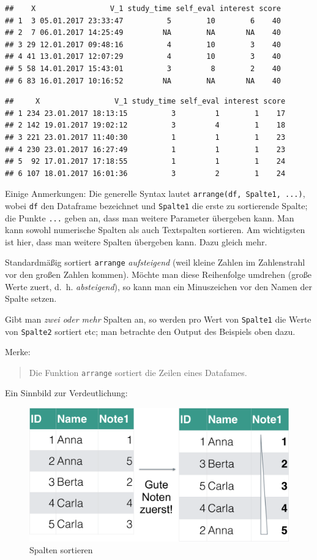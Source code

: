 \documentclass[12pt,ngerman,paper=a4,pagesize,DIV=13]{scrreprt}
\begin{document}
\begin{verbatim}
##    X                 V_1 study_time self_eval interest score
## 1  3 05.01.2017 23:33:47          5        10        6    40
## 2  7 06.01.2017 14:25:49         NA        NA       NA    40
## 3 29 12.01.2017 09:48:16          4        10        3    40
## 4 41 13.01.2017 12:07:29          4        10        3    40
## 5 58 14.01.2017 15:43:01          3         8        2    40
## 6 83 16.01.2017 10:16:52         NA        NA       NA    40
\end{verbatim}

\begin{verbatim}
##     X                 V_1 study_time self_eval interest score
## 1 234 23.01.2017 18:13:15          3         1        1    17
## 2 142 19.01.2017 19:02:12          3         4        1    18
## 3 221 23.01.2017 11:40:30          1         1        1    23
## 4 230 23.01.2017 16:27:49          1         1        1    23
## 5  92 17.01.2017 17:18:55          1         1        1    24
## 6 107 18.01.2017 16:01:36          3         2        1    24
\end{verbatim}

Einige Anmerkungen: Die generelle Syntax lautet
\texttt{arrange(df,\ Spalte1,\ ...)}, wobei \texttt{df} den Dataframe
bezeichnet und \texttt{Spalte1} die erste zu sortierende Spalte; die
Punkte \texttt{...} geben an, dass man weitere Parameter übergeben kann.
Man kann sowohl numerische Spalten als auch Textspalten sortieren. Am
wichtigsten ist hier, dass man weitere Spalten übergeben kann. Dazu
gleich mehr.

Standardmäßig sortiert \texttt{arrange} \emph{aufsteigend} (weil kleine
Zahlen im Zahlenstrahl vor den großen Zahlen kommen). Möchte man diese
Reihenfolge umdrehen (große Werte zuert, d.~h. \emph{absteigend}), so
kann man ein Minuszeichen vor den Namen der Spalte setzen.

Gibt man \emph{zwei oder mehr} Spalten an, so werden pro Wert von
\texttt{Spalte1} die Werte von \texttt{Spalte2} sortiert etc; man
betrachte den Output des Beispiels oben dazu.

Merke:

\begin{quote}
Die Funktion \texttt{arrange} sortiert die Zeilen eines Datafames.
\end{quote}

Ein Sinnbild zur Verdeutlichung:

\begin{figure}

{\centering \includegraphics[width=0.6\linewidth]{Inhalte/images/Datenjudo/arrange} 

}

\caption{Spalten sortieren}\label{fig:fig-arrange}
\end{figure}
\end{document}
